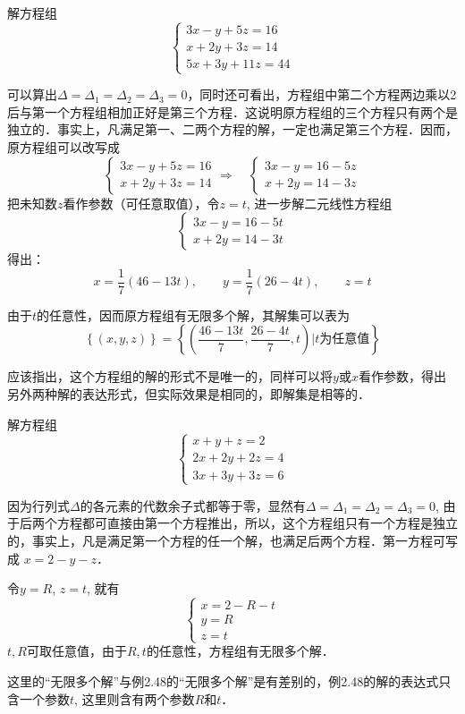 \begin{example}
    解方程组
    \[\begin{cases}
        3x-y+5z=16\\
        x+2y+3z=14\\
        5x+3y+11z=44
    \end{cases}\]
\end{example}

\begin{solution}
    可以算出$\Delta=\Delta_1=\Delta_2=\Delta_3=0$，同时还可看出，方程组中第二个方程两边乘以2后与第一个方程组相加正好是第三个方程．这说明原方程组的三个方程只有两个是独立的．事实上，凡满足第一、二两个方程的解，一定也满足第三个方程．因而，原方程组可以改写成
    \[\begin{cases}
        3x-y+5z=16\\x+2y+3z=14
    \end{cases}\Rightarrow\quad \begin{cases}
        3x-y=16-5z\\x+2y=14-3z
    \end{cases}\]
    把未知数$z$看作参数（可任意取值），令$z=t$, 进一步解二元线性方程组
    \[\begin{cases}
        3x-y=16-5t\\x+2y=14-3t
    \end{cases}\]
    得出：
\[x=\frac{1}{7}(46-13t),\qquad y=\frac{1}{7}(26-4t),\qquad z=t\]

    由于$t$的任意性，因而原方程组有无限多个解，其解集可以表为
\[\left\{(x,y,z)\right\}=\left\{\left(\frac{46-13t}{7},\frac{26-4t}{7},t\right)\Big|\text{$t$为任意值}\right\}\]
\end{solution}

应该指出，这个方程组的解的形式不是唯一的，同样可以将$y$或$x$看作参数，得出另外两种解的表达形式，但实际效果是相同的，即解集是相等的．



\begin{example}
    解方程组
\[\begin{cases}
    x+y+z=2\\
    2x+2y+2z=4\\
    3x+3y+3z=6
\end{cases}\]
\end{example}

\begin{solution}
因为行列式$\Delta$的各元素的代数余子式都等于零，显然有$\Delta=\Delta_1=\Delta_2=\Delta_3=0$, 由于后两个方程都可直接由第一个方程推出，所以，这个方程组只有一个方程是独立的，事实上，凡是满足第一个方程的任一个解，也满足后两个方程．第一方程可写成
$x=2-y-z$．

令$y=R$, $z=t$, 就有
\[\begin{cases}
    x=2-R-t\\ y=R\\ z=t 
\end{cases}\]
$t,R$可取任意值，由于$R,t$的任意性，方程组有无限多个解．

这里的“无限多个解”与例2.48的“无限多个解”是有差别的，例2.48的解的表达式只含一个参数$t$, 这里则含有两个参数$R$和$t$．   
\end{solution}

